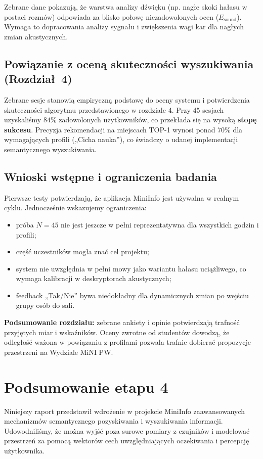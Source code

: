 \documentclass[14pt,a4paper]{extarticle}
\begin{document}
Zebrane dane pokazują, że warstwa analizy dźwięku (np. nagłe skoki hałasu w postaci rozmów) odpowiada za blisko połowę niezadowolonych ocen ($E_{\text{sound}}$). Wymaga to dopracowania analizy sygnału i zwiększenia wagi kar dla nagłych zmian akustycznych.

\subsection{Powiązanie z oceną skuteczności wyszukiwania (Rozdział~4)}
Zebrane sesje stanowią empiryczną podstawę do oceny systemu i potwierdzenia skuteczności algorytmu przedstawionego w rozdziale 4. Przy 45 sesjach uzyskaliśmy $84\%$ zadowolonych użytkowników, co przekłada się na wysoką \textbf{stopę sukcesu}. Precyzja rekomendacji na miejscach TOP-1 wynosi ponad 70\% dla wymagających profili („Cicha nauka”), co świadczy o udanej implementacji semantycznego wyszukiwania.

\subsection{Wnioski wstępne i ograniczenia badania}
Pierwsze testy potwierdzają, że aplikacja MiniInfo jest używalna w realnym cyklu. Jednocześnie wskazujemy ograniczenia:
\begin{itemize}
    \item próba $N = 45$ nie jest jeszcze w pełni reprezentatywna dla wszystkich godzin i profili;
    \item część uczestników mogła znać cel projektu;
    \item system nie uwzględnia w pełni mowy jako wariantu hałasu uciążliwego, co wymaga kalibracji w deskryptorach akustycznych;
    \item feedback „Tak/Nie” bywa niedokładny dla dynamicznych zmian po wejściu grupy osób do sali.
\end{itemize}

\textbf{Podsumowanie rozdziału:} zebrane ankiety i opinie potwierdzają trafność przyjętych miar i wskaźników. Oceny zwrotne od studentów dowodzą, że odległość ważona w powiązaniu z profilami pozwala trafnie dobierać propozycje przestrzeni na Wydziale MiNI PW.

\section{Podsumowanie etapu 4}

Niniejszy raport przedstawił wdrożenie w projekcie MiniInfo zaawansowanych mechanizmów semantycznego pozyskiwania i wyszukiwania informacji. Udowodniliśmy, że można wyjść poza surowe pomiary z czujników i modelować przestrzeń za pomocą wektorów cech uwzględniających oczekiwania i percepcję użytkownika.
\end{document}
